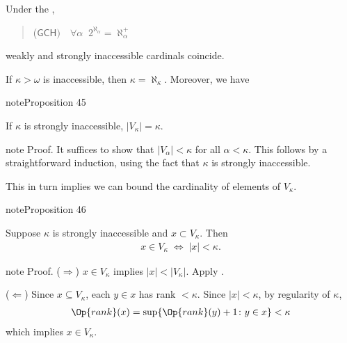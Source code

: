 \documentclass[letterpaper,10pt,english]{jupyterBook}
\begin{document}
\sphinxAtStartPar
Under the ,
\begin{quote}

\sphinxAtStartPar
(\(\mathsf{GCH}) \quad \forall \alpha \;\;  2^{\aleph_\alpha} = \aleph_{\alpha}^+\)
\end{quote}

\sphinxAtStartPar
weakly and strongly inaccessible cardinals coincide.

\sphinxAtStartPar
If \(\kappa > \omega\) is inaccessible, then \(\kappa = \aleph_\kappa\). Moreover, we have
\label{large_cardinals:prop-cardinality-Vkappa}
\begin{sphinxadmonition}{note}{Proposition 45}



\sphinxAtStartPar
If \(\kappa\) is strongly inaccessible, \(|V_\kappa| = \kappa\).
\end{sphinxadmonition}

\begin{sphinxadmonition}{note}
\sphinxAtStartPar
Proof. It suffices to show that \(|V_\alpha| < \kappa\) for all \(\alpha < \kappa\). This follows by a straightforward induction, using the fact that \(\kappa\) is strongly inaccessible.
\end{sphinxadmonition}

\sphinxAtStartPar
This in turn implies we can bound the cardinality of elements of \(V_\kappa\).
\label{large_cardinals:prop-inaccessible-cardinality}
\begin{sphinxadmonition}{note}{Proposition 46}



\sphinxAtStartPar
Suppose \(\kappa\) is strongly inaccessible and \(x\subset V_\kappa\). Then
\begin{equation*}
\begin{split}
    x \in V_\kappa \; \Leftrightarrow \; |x| < \kappa.
\end{split}
\end{equation*}\end{sphinxadmonition}

\begin{sphinxadmonition}{note}
\sphinxAtStartPar
Proof. (\(\Rightarrow\)) \(x \in V_\kappa\) implies \(|x| < |V_\kappa|\). Apply {\hyperref[\detokenize{large_cardinals:prop-cardinality-Vkappa}]{}}.

\sphinxAtStartPar
(\(\Leftarrow\)) Since \(x \subseteq V_\kappa\), each \(y \in x\) has rank \(< \kappa\). Since \(|x| < \kappa\), by regularity of \(\kappa\),
\begin{equation*}
\begin{split}
    \Op{rank}(x) = \sup\{\Op{rank}(y)+1 \colon y \in x\} < \kappa
\end{split}
\end{equation*}
\sphinxAtStartPar
which implies \(x \in V_\kappa\).
\end{sphinxadmonition}
\end{document}
